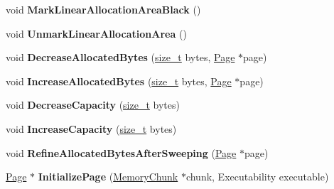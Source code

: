 \begin{DoxyCompactItemize}
\item 
\mbox{\label{classv8_1_1internal_1_1PagedSpace_a44db2a2fb8bcf7227f68d00f958f64bf}} 
void {\bfseries Mark\+Linear\+Allocation\+Area\+Black} ()
\item 
\mbox{\label{classv8_1_1internal_1_1PagedSpace_a81d7dad4eb4d0e101c447d833a55860b}} 
void {\bfseries Unmark\+Linear\+Allocation\+Area} ()
\item 
\mbox{\label{classv8_1_1internal_1_1PagedSpace_a25f3112028608189499cdf7041c8dc71}} 
void {\bfseries Decrease\+Allocated\+Bytes} (\mbox{\hyperlink{classsize__t}{size\+\_\+t}} bytes, \mbox{\hyperlink{classv8_1_1internal_1_1Page}{Page}} $\ast$page)
\item 
\mbox{\label{classv8_1_1internal_1_1PagedSpace_ae1478a2a4e3b71da6a79ef15a0fa5c5f}} 
void {\bfseries Increase\+Allocated\+Bytes} (\mbox{\hyperlink{classsize__t}{size\+\_\+t}} bytes, \mbox{\hyperlink{classv8_1_1internal_1_1Page}{Page}} $\ast$page)
\item 
\mbox{\label{classv8_1_1internal_1_1PagedSpace_af77b28ac44111a4d5fde54472b98b5cf}} 
void {\bfseries Decrease\+Capacity} (\mbox{\hyperlink{classsize__t}{size\+\_\+t}} bytes)
\item 
\mbox{\label{classv8_1_1internal_1_1PagedSpace_a9a70458af4feb7c26b03a8f42a4e66cf}} 
void {\bfseries Increase\+Capacity} (\mbox{\hyperlink{classsize__t}{size\+\_\+t}} bytes)
\item 
\mbox{\label{classv8_1_1internal_1_1PagedSpace_a8e588038c3a9f13a92d9eeb4f3a6573b}} 
void {\bfseries Refine\+Allocated\+Bytes\+After\+Sweeping} (\mbox{\hyperlink{classv8_1_1internal_1_1Page}{Page}} $\ast$page)
\item 
\mbox{\label{classv8_1_1internal_1_1PagedSpace_a49d220b646897e508761f38ca31b294a}} 
\mbox{\hyperlink{classv8_1_1internal_1_1Page}{Page}} $\ast$ {\bfseries Initialize\+Page} (\mbox{\hyperlink{classv8_1_1internal_1_1MemoryChunk}{Memory\+Chunk}} $\ast$chunk, Executability executable)

\end{DoxyCompactItemize}
